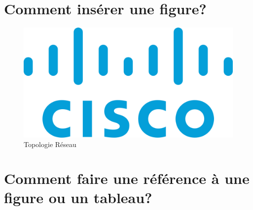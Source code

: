 \documentclass[a4paper,12 pt,twoside]{report}
\begin{document}
\newpage
\section{Comment insérer une figure?}



\begin{figure} [!h]

    \center
    \includegraphics[scale=0.2]{logos/cisco}
    \caption{Topologie Réseau\label{cisco}}

\end{figure}

\section{Comment faire une référence à une figure ou un tableau?}
\end{document}
